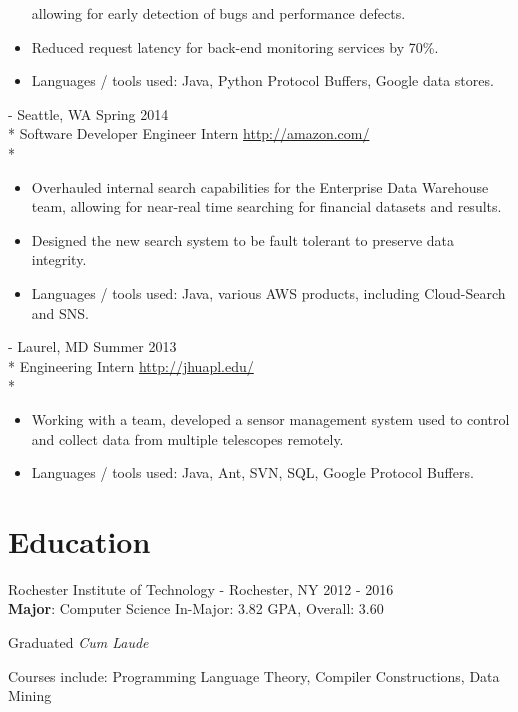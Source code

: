 \documentclass[a4paper,margin,line]{resume}
\newcommand{\rurl}[1]{\hfill {\footnotesize \url{#1}}}
\newcommand{\rdate}[1]{\hfill {\small #1}}
\renewcommand{\employer}[5]{ \item[#1] - #2 \rdate{#3} \\* #4 \rurl{#5} \\*}
\begin{document}
\begin{resume}
\begin{asparadesc}
\begin{itemize}
      allowing for early detection of bugs and performance defects.
    \item Reduced request latency for back-end monitoring services by 70\%.
    \item Languages / tools used: Java, Python Protocol Buffers, Google data stores.
    \end{itemize}
    \employer{Amazon}{Seattle, WA}{Spring 2014}{Software Developer Engineer
      Intern}{http://amazon.com/}
    \vspace{-5mm}
    \begin{itemize}
    \item Overhauled internal search capabilities for the Enterprise Data
      Warehouse team, allowing for near-real time searching for financial
      datasets and results.
    \item Designed the new search system to be fault tolerant to preserve data
      integrity.
    \item Languages / tools used: Java, various AWS products, including
      Cloud-Search and SNS.
    \end{itemize}
    \employer{John Hopkins University Applied Physics Lab}{Laurel, MD}{Summer 2013}{Engineering
      Intern}{http://jhuapl.edu/}
    \vspace{-5mm}
    \begin{itemize}
    \item Working with a team, developed a sensor management system used to control and collect data
      from multiple telescopes remotely.
    \item Languages / tools used: Java, Ant, SVN, SQL, Google Protocol Buffers.
    \end{itemize}
  \end{asparadesc}
  \section{\mysidestyle Education}
  \begin{compactdesc}
  \item[Rochester Institute of Technology] - Rochester, NY \hfill {2012 - 2016} \\
    \textbf{Major}: Computer Science \hfill {In-Major: 3.82 GPA, Overall: 3.60} \\
    \vspace{-4mm}
    \begin{flushright} Graduated \textit{Cum Laude} \end{flushright}
    \vspace{1mm}
    \small Courses include: Programming Language Theory, Compiler Constructions, Data Mining
  \end{compactdesc}
  \vspace{-2mm}

\end{resume}
\end{document}
